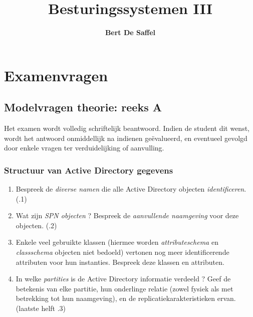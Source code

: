 \documentclass{report}
\title{\textbf{Besturingssystemen III}}
\author{\textbf{Bert De Saffel}}
\date{}
\begin{document}
	\maketitle
	\tableofcontents
	\part{Examenvragen}
	\chapter{Modelvragen theorie: reeks A}
	Het examen wordt {\color{red} volledig schriftelijk} beantwoord. Indien de student dit wenst, wordt het antwoord onmiddellijk na indienen geëvalueerd, en eventueel gevolgd door enkele vragen ter verduidelijking of aanvulling.
	
	\section{Structuur van Active Directory gegevens}
	\begin{enumerate}
		\item Bespreek de \textit{diverse namen} die alle Active Directory objecten \textit{identificeren}. { \color{red} (.1) }
		
		\item Wat zijn \textit{SPN objecten} ? Bespreek de \textit{aanvullende naamgeving} voor deze objecten. {\color{red} (.2)}
		
		\item Enkele veel gebruikte klassen (hiermee worden \textit{attributeschema} en \textit{classschema} objecten niet bedoeld) vertonen nog meer identificerende attributen voor hun instanties. Bespreek deze klassen en attributen.
		
		\item In welke \textit{partities} is de Active Directory informatie verdeeld ? Geef de betekenis van elke partitie, hun onderlinge relatie (zowel fysiek als met betrekking tot hun naamgeving), en de replicatiekarakteristieken ervan. {\color{red} (laatste helft .3)}
	\end{enumerate}
\end{document}
